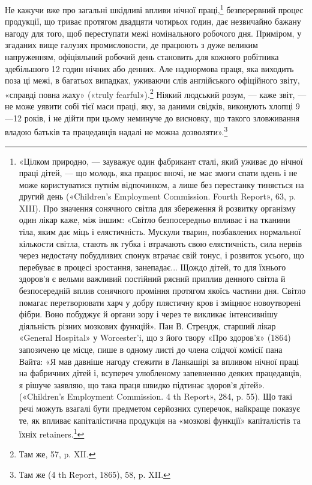 Не кажучи вже про загальні шкідливі впливи нічної праці,\footnote{
«Цілком природно, — зауважує один фабрикант сталі, який
уживає до нічної праці дітей, — що молодь, яка працює вночі, не має
змоги спати вдень і не може користуватися путнім відпочинком, а лише
без перестанку тиняється на другий день («Children’s Employment Commission.
Fourth Report», 63, p. XIII). Про значення сонячного світла для
збереження й розвитку організму один лікар каже, між іншим: «Світло
безпосередньо впливає і на тканини тіла, яким дає міць і елястичність.
Мускули тварин, позбавлених нормальної кількости світла, стають як губка
і втрачають свою елястичність, сила нервів через недостачу побудливих
спонук втрачає свій тонус, і розвиток усього, що перебуває в процесі
зростання, занепадає... Щождо дітей, то для їхнього здоров’я є вельми
важливий постійний рясний приплив денного світла й безпосередній вплив
сонячного проміння протягом якоїсь частини дня. Світло помагає перетворювати
харч у добру плястичну кров і зміцнює новоутворені фібри. Воно
побуджує й органи зору і через те викликає інтенсивнішу діяльність різних
мозкових функцій». Пан В. Стрендж, старший лікар «General Hospital»
у Worcester’i, що з його твору «Про здоров’я» (1864) запозичено це
місце, пише в одному листі до члена слідчої комісії пана Вайта: «Я мав
давніше нагоду стежити в Ланкашірі за впливом нічної праці на фабричних
дітей і, всупереч улюбленому запевненню деяких працедавців, я
рішуче заявляю, що така праця швидко підтинає здоров’я дітей». («Children’s
Employment Commission. 4 th Report», 284, p. 55). Що такі речі
можуть взагалі бути предметом серйозних суперечок, найкраще показує
те, як впливає капіталістична продукція на «мозкові функції» капіталістів
та їхніх retainers.\footnote*{
— прихильників. \emph{Ред.}
}
}
безперервний процес продукції, що триває протягом двадцяти чотирьох
годин, дає незвичайно бажану нагоду для того, щоб переступати
межі номінального робочого дня. Приміром, у згаданих
вище галузях промисловости, де працюють з дуже великим напруженням,
офіціяльний робочий день становить для кожного робітника
здебільшого 12 годин нічних або денних. Але наднормова
праця, яка виходить поза ці межі, в багатьох випадках, уживаючи
слів англійського офіційного звіту, «справді повна жаху»
(«truly fearful»).\footnote{
Там же, 57, p. XII.
} Ніякий людський розум, — каже звіт, — не
може уявити собі тієї маси праці, яку, за даними свідків, виконують
хлопці 9—12 років, і не дійти при цьому неминуче
до висновку, що такого зловживання владою батьків та працедавців
надалі не можна дозволяти».\footnote{
Там же (4 th Report, 1865), 58, p. XII.
}

